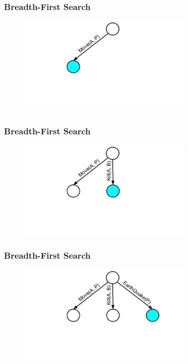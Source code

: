 \documentclass{beamer}
\begin{document}
\begin{frame}[fragile]
\frametitle{Breadth-First Search}
\begin{figure}[h]
	\includegraphics[width=8.5cm]{Diagrams/BreadthFirst/BreadthTreeOne.pdf}
	\centering
\end{figure}
\end{frame}

\begin{frame}[fragile]
\frametitle{Breadth-First Search}
\begin{figure}[h]
	\includegraphics[width=8.5cm]{Diagrams/BreadthFirst/BreadthTreeTwo.pdf}
	\centering
\end{figure}
\end{frame}

\begin{frame}[fragile]
\frametitle{Breadth-First Search}
\begin{figure}[h]
	\includegraphics[width=8.5cm]{Diagrams/BreadthFirst/BreadthTreeThree.pdf}
	\centering
\end{figure}
\end{frame}
\end{document}
